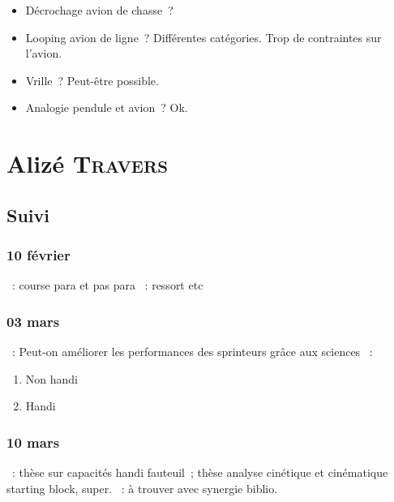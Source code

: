 \documentclass[a4paper, 11pt, final, garamond]{book}
\begin{document}
\begin{itemize}
  \item Décrochage avion de chasse~?
  \item Looping avion de ligne~? Différentes catégories. Trop de contraintes sur
    l'avion.
  \item Vrille~? Peut-être possible.
  \item Analogie pendule et avion~? Ok.
\end{itemize}

\chapter{Alizé \textsc{Travers}}
\label{ch:alize}
\section{Suivi}
\subsection{10 février}

\begin{itemize}
    ~: course para et pas para
    ~: ressort etc
\end{itemize}

\subsection{03 mars}
\begin{itemize}
    ~: Peut-on améliorer les performances des sprinteurs grâce
        aux sciences
    ~:
        \begin{enumerate}[label=\protect\fbox{\Roman*}]
            \item Non handi
            \item Handi
        \end{enumerate}
\end{itemize}

\subsection{10 mars}
\begin{itemize}
    ~: thèse sur capacités handi fauteuil~; thèse analyse cinétique
        et cinématique starting block, super.
    ~: à trouver avec synergie biblio.
\end{itemize}
\end{document}
